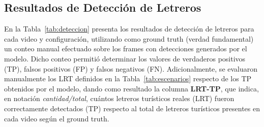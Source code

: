 \documentclass[runningheads]{llncs}
\begin{document}
\subsection{Resultados de Detección de Letreros}
\label{subsec:resultados-deteccion}

En la Tabla~\ref{tab:deteccion} presenta los resultados de detección de 
letreros para cada video y configuración, utilizando como ground truth
 (verdad fundamental) un conteo manual efectuado sobre los frames con
  detecciones generados por el modelo. Dicho conteo permitió determinar
   los valores de verdaderos positivos (TP), falsos positivos (FP) y 
   falsos negativos (FN). Adicionalmente, se evaluaron manualmente los
    LRT definidos en la Tabla~\ref{tab:escenarios} respecto de los
TP obtenidos por el modelo, dando como resultado la columna \textbf{LRT-TP},
que indica, en notación \textit{cantidad/total}, cuántos letreros 
turísticos reales (LRT) fueron correctamente detectados (TP) respecto 
al total de letreros turísticos presentes en cada video según el 
ground truth.
\end{document}
